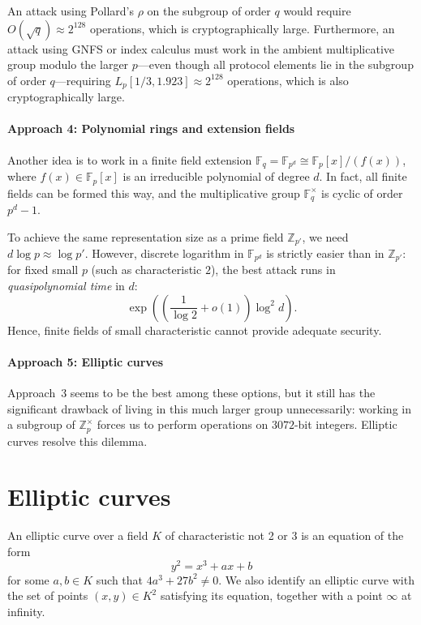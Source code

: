 An attack using Pollard's \(\rho\) on the subgroup of order \(q\) would require \(O(\sqrt{q}) \approx 2^{128}\) operations, which is cryptographically large.
Furthermore, an attack using GNFS or index calculus must work in the ambient multiplicative group modulo the larger \(p\)---even though all protocol elements lie in the subgroup of order \(q\)---requiring \(L_p[1/3, 1.923] \approx 2^{128}\) operations, which is also cryptographically large.

\paragraph*{Approach 4: Polynomial rings and extension fields}

Another idea is to work in a finite field extension \(\mathbb{F}_q = \mathbb{F}_{p^d} \cong \mathbb{F}_p[x] / (f(x))\), where \(f(x) \in \mathbb{F}_p[x]\) is an irreducible polynomial of degree \(d\).
In fact, all finite fields can be formed this way, and the multiplicative group \(\mathbb{F}_q^\times\) is cyclic of order \(p^d - 1\).

To achieve the same representation size as a prime field \(\mathbb{Z}_{p'}\), we need \(d \log p \approx \log p'\).
However, discrete logarithm in \(\mathbb{F}_{p^d}\) is strictly easier than in \(\mathbb{Z}_{p'}\): for fixed small \(p\) (such as characteristic \(2\)), the best attack \cite{GrangerKleinjungZumbragel2018} runs in \emph{quasipolynomial time} in \(d\):
\[
    \exp\left( \left(\frac{1}{\log 2} + o(1)\right) \log^2 d \right).
\]
Hence, finite fields of small characteristic cannot provide adequate security.

\paragraph*{Approach 5: Elliptic curves}

Approach~3 seems to be the best among these options, but it still has the significant drawback of living in this much larger group unnecessarily: working in a subgroup of \(\mathbb{Z}_p^\times\) forces us to perform operations on \(3072\)-bit integers.
Elliptic curves resolve this dilemma.

\section*{Elliptic curves}

\begin{definition}
    An elliptic curve over a field \(K\) of characteristic not 2 or 3 is an equation of the form
    \[
        y^2 = x^3 + ax + b
    \]
    for some \(a, b \in K\) such that \(4a^3 + 27b^2 \neq 0\).
    We also identify an elliptic curve with the set of points \((x, y) \in K^2\) satisfying its equation, together with a point \(\infty\) at infinity.
\end{definition}

